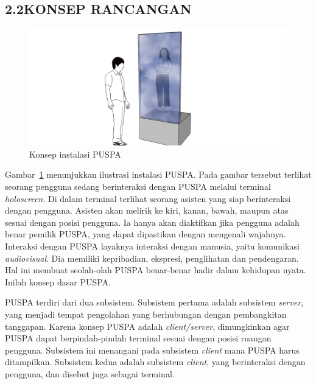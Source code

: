 \subsection*{\textsf{\normalsize 2.2\hspace{0.5cm}KONSEP RANCANGAN}}

\begin{figure}
	\centering
		\includegraphics[scale=0.4]{konsep}
	\caption{Konsep instalasi PUSPA}
	\label{fig:konsep}
\end{figure}
Gambar~\ref{fig:konsep} menunjukkan ilustrasi instalasi PUSPA. Pada gambar tersebut terlihat seorang pengguna sedang berinteraksi dengan PUSPA melalui terminal \textit{holoscreen}. Di dalam terminal terlihat seorang asisten yang siap berinteraksi dengan pengguna. Asisten akan melirik ke kiri, kanan, bawah, maupun atas sesuai dengan posisi pengguna. Ia hanya akan diaktifkan jika pengguna adalah benar pemilik PUSPA, yang dapat dipastikan dengan mengenali wajahnya. Interaksi dengan PUSPA layaknya interaksi dengan manusia, yaitu komunikasi \textit{audiovisual}. Dia memiliki kepribadian, ekspresi, penglihatan dan pendengaran. Hal ini membuat seolah-olah PUSPA benar-benar hadir dalam kehidupan nyata. Inilah konsep dasar PUSPA.

PUSPA terdiri dari dua subsistem.
Subsistem pertama adalah subsistem \textit{server}, yang menjadi tempat pengolahan yang berhubungan dengan pembangkitan tanggapan.
Karena konsep PUSPA adalah \textit{client/server},
dimungkinkan agar PUSPA dapat berpindah-pindah terminal sesuai dengan posisi ruangan pengguna.
Subsistem ini menangani pada subsistem \textit{client} mana PUSPA harus ditampilkan.
Subsistem kedua adalah subsistem \textit{client}, yang berinteraksi dengan pengguna,
dan disebut juga sebagai terminal.

